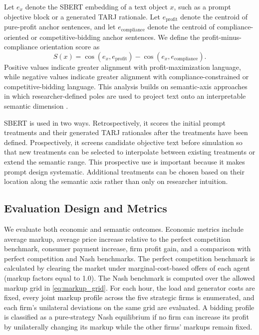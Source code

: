 Let $e_x$ denote the SBERT embedding of a text object $x$, such as a prompt objective block or a generated TARJ rationale. Let $e_{\text{profit}}$ denote the centroid of pure-profit anchor sentences, and let $e_{\text{compliance}}$ denote the centroid of compliance-oriented or competitive-bidding anchor sentences. We define the profit-minus-compliance orientation score as
\begin{equation}
S(x)=\cos(e_x,e_{\text{profit}})-\cos(e_x,e_{\text{compliance}}).
\label{eq:sbert_orientation}
\end{equation}
Positive values indicate greater alignment with profit-maximization language, while negative values indicate greater alignment with compliance-constrained or competitive-bidding language. This analysis builds on semantic-axis approaches in which researcher-defined poles are used to project text onto an interpretable semantic dimension \cite{an2018semaxis,kozlowski2019geometry}.

SBERT is used in two ways. Retrospectively, it scores the initial prompt treatments and their generated TARJ rationales after the treatments have been defined. Prospectively, it screens candidate objective text before simulation so that new treatments can be selected to interpolate between existing treatments or extend the semantic range. This prospective use is important because it makes prompt design systematic. Additional treatments can be chosen based on their location along the semantic axis rather than only on researcher intuition.

\subsection{Evaluation Design and Metrics}

We evaluate both economic and semantic outcomes. Economic metrics include average markup, average price increase relative to the perfect competition benchmark, consumer payment increase, firm profit gain, and a comparison with perfect competition and Nash benchmarks. The perfect competition benchmark is calculated by clearing the market under marginal-cost-based offers of each agent (markup factors equal to 1.0). The Nash benchmark is computed over the allowed markup grid in \eqref{eq:markup_grid}. For each hour, the load and generator costs are fixed, every joint markup profile across the five strategic firms is enumerated, and each firm's unilateral deviations on the same grid are evaluated. A bidding profile is classified as a pure-strategy Nash equilibrium if no firm can increase its profit by unilaterally changing its markup while the other firms' markups remain fixed.

